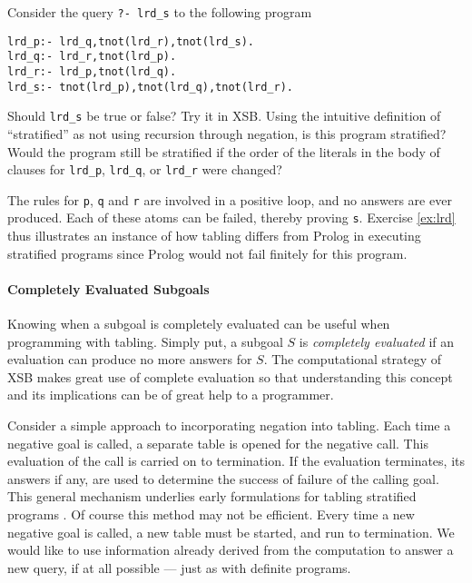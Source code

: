 \begin{exercise} \label{ex:lrd}
Consider the query {\tt ?- lrd\_s} to the following program
\begin{verbatim}
lrd_p:- lrd_q,tnot(lrd_r),tnot(lrd_s).
lrd_q:- lrd_r,tnot(lrd_p).
lrd_r:- lrd_p,tnot(lrd_q).
lrd_s:- tnot(lrd_p),tnot(lrd_q),tnot(lrd_r). 
\end{verbatim}
Should {\tt lrd\_s} be true or false?  Try it in XSB.  Using the
intuitive definition of ``stratified'' as not using recursion through
negation, is this program stratified?  Would the program still be
stratified if the order of the literals in the body of clauses for
{\tt lrd\_p}, {\tt lrd\_q}, or {\tt lrd\_r} were changed?
\end{exercise}

The rules for {\tt p}, {\tt q} and {\tt r} are involved in a positive
loop, and no answers are ever produced.  Each of these atoms can be
failed, thereby proving {\tt s}.  Exercise \ref{ex:lrd} thus
illustrates an instance of how tabling differs from Prolog in
executing stratified programs since Prolog would not fail finitely for
this program.

\paragraph*{Completely Evaluated Subgoals}

Knowing when a subgoal is completely evaluated can be useful when
programming with tabling.  Simply put, a subgoal $S$ is {\em completely
evaluated} if an evaluation can produce no more answers for $S$.  The
computational strategy of XSB makes great use of complete evaluation
so that understanding this concept and its implications can be of
great help to a programmer.

Consider a simple approach to incorporating negation into tabling.
Each time a negative goal is called, a separate table is opened for
the negative call.  This evaluation of the call is carried on to
termination.  If the evaluation terminates, its answers if any, are
used to determine the success of failure of the calling goal.  This
general mechanism underlies early formulations for tabling stratified
programs \cite{KeTo88,Seki89}.  Of course this method may not be
efficient.  Every time a new negative goal is called, a new table must
be started, and run to termination.  We would like to use information
already derived from the computation to answer a new query, if at all
possible --- just as with definite programs.

